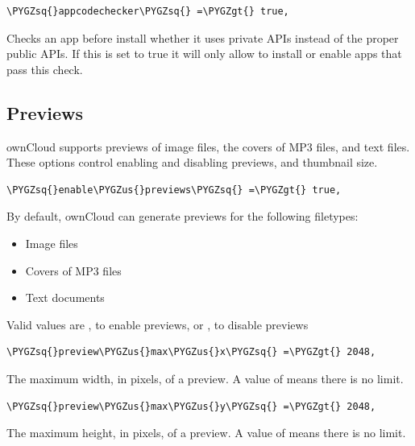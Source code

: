 \documentclass[letterpaper,10pt,english]{sphinxmanual}
\def\PYGZus{\char`\_}
\def\PYGZgt{\char`\>}
\def\PYGZsq{\char`\'}
\renewcommand\PYGZsq{\textquotesingle}
\begin{document}
\begin{Verbatim}[commandchars=\\\{\}]
\PYGZsq{}appcodechecker\PYGZsq{} =\PYGZgt{} true,
\end{Verbatim}

Checks an app before install whether it uses private APIs instead of the
proper public APIs. If this is set to true it will only allow to install or
enable apps that pass this check.


\subsection{Previews}
\label{configuration_server/config_sample_php_parameters:previews}
ownCloud supports previews of image files, the covers of MP3 files, and text
files. These options control enabling and disabling previews, and thumbnail
size.

\begin{Verbatim}[commandchars=\\\{\}]
\PYGZsq{}enable\PYGZus{}previews\PYGZsq{} =\PYGZgt{} true,
\end{Verbatim}

By default, ownCloud can generate previews for the following filetypes:
\begin{itemize}
\item {} 
Image files

\item {} 
Covers of MP3 files

\item {} 
Text documents

\end{itemize}

Valid values are , to enable previews, or
, to disable previews

\begin{Verbatim}[commandchars=\\\{\}]
\PYGZsq{}preview\PYGZus{}max\PYGZus{}x\PYGZsq{} =\PYGZgt{} 2048,
\end{Verbatim}

The maximum width, in pixels, of a preview. A value of  means there
is no limit.

\begin{Verbatim}[commandchars=\\\{\}]
\PYGZsq{}preview\PYGZus{}max\PYGZus{}y\PYGZsq{} =\PYGZgt{} 2048,
\end{Verbatim}

The maximum height, in pixels, of a preview. A value of  means there
is no limit.
\end{document}

